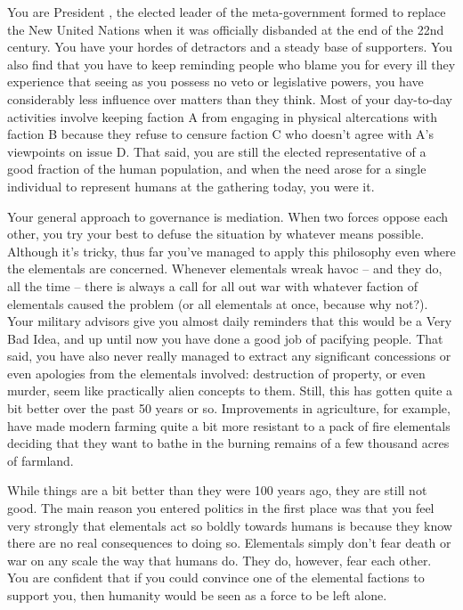 \documentclass[char]{elementals}
\begin{document}
\name{\cLeader{}}

You are President \cLeader{\intro}, the elected leader of the meta-government formed to replace the New United Nations when it was officially disbanded at the end of the 22nd century. You have your hordes of detractors and a steady base of supporters. You also find that you have to keep reminding people who blame you for every ill they experience that seeing as you possess no veto or legislative powers, you have considerably less influence over matters than they think. Most of your day-to-day activities involve keeping faction A from engaging in physical altercations with faction B because they refuse to censure faction C who doesn't agree with A's viewpoints on issue D. That said, you are still the elected representative of a good fraction of the human population, and when the need arose for a single individual to represent humans at the gathering today, you were it.

Your general approach to governance is mediation. When two forces oppose each other, you try your best to defuse the situation by whatever means possible. Although it's tricky, thus far you've managed to apply this philosophy even where the elementals are concerned. Whenever elementals wreak havoc -- and they do, all the time -- there is always a call for all out war with whatever faction of elementals caused the problem (or all elementals at once, because why not?). Your military advisors give you almost daily reminders that this would be a Very Bad Idea, and up until now you have done a good job of pacifying people. That said, you have also never really managed to extract any significant concessions or even apologies from the elementals involved: destruction of property, or even murder, seem like practically alien concepts to them. Still, this has gotten quite a bit better over the past 50 years or so. Improvements in agriculture, for example, have made modern farming quite a bit more resistant to a pack of fire elementals deciding that they want to bathe in the burning remains of a few thousand acres of farmland.

While things are a bit better than they were 100 years ago, they are still not good. The main reason you entered politics in the first place was that you feel very strongly that elementals act so boldly towards humans is because they know there are no real consequences to doing so. Elementals simply don't fear death or war on any scale the way that humans do. They do, however, fear each other. You are confident that if you could convince one of the elemental factions to support you, then humanity would be seen as a force to be left alone.
\end{document}
